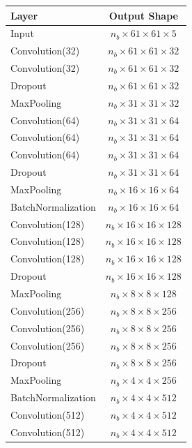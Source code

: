     \begin{table}[h!]
        \centering
        \begin{tabular}{ l | c  }
            Layer & Output Shape  \\ \hline
            Input & $n_b\times61\times61\times5$  \\
            Convolution(32) & $n_b\times61\times61\times32$  \\
            Convolution(32) & $n_b\times61\times61\times32$  \\
            Dropout & $n_b\times61\times61\times32$  \\
            MaxPooling & $n_b\times31\times31\times32$ \\
            Convolution(64) & $n_b\times31\times31\times64$  \\
            Convolution(64) & $n_b\times31\times31\times64$  \\
            Convolution(64) & $n_b\times31\times31\times64$  \\
            Dropout & $n_b\times31\times31\times64$  \\
            MaxPooling & $n_b\times16\times16\times64$ \\
            BatchNormalization & $n_b\times16\times16\times64$ \\
            Convolution(128) & $n_b\times16\times16\times128$  \\
            Convolution(128) & $n_b\times16\times16\times128$  \\
            Convolution(128) & $n_b\times16\times16\times128$  \\
            Dropout & $n_b\times16\times16\times128$  \\
            MaxPooling & $n_b\times8\times8\times128$ \\
            Convolution(256) & $n_b\times8\times8\times256$  \\
            Convolution(256) & $n_b\times8\times8\times256$  \\
            Convolution(256) & $n_b\times8\times8\times256$  \\
            Dropout & $n_b\times8\times8\times256$  \\
            MaxPooling & $n_b\times4\times4\times256$ \\
            BatchNormalization & $n_b\times4\times4\times512$  \\
            Convolution(512) & $n_b\times4\times4\times512$  \\
            Convolution(512) & $n_b\times4\times4\times512$  \\

\end{tabular}
\end{table}
